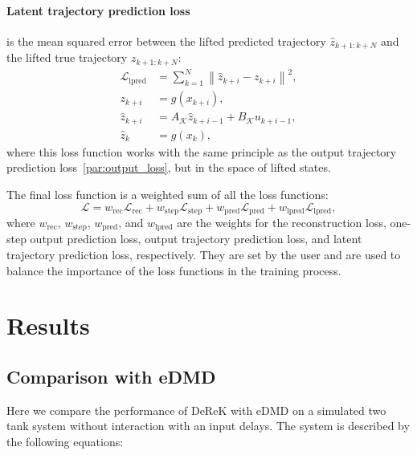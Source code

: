 \documentclass[conference]{IEEEtran}
\newcommand{\ui}[2]{#1_{\text{#2}}}
\begin{document}
\paragraph*{Latent trajectory prediction loss}
is the mean squared error between the lifted predicted trajectory \(\hat{z}_{k+1:k+N}\) and the lifted true trajectory \(z_{k+1:k+N}\):
\begin{subequations}
    \begin{align}
        \mathcal{L}_{\text{lpred}} & = \sum_{k=1}^{N}\left\|\hat{z}_{k+i} - z_{k+i}\right\|^2,  \\
        z_{k+i}                    & = g(x_{k+i}),                                              \\
        \hat{z}_{k+i}              & = A_{\mathcal{K}}\hat{z}_{k+i-1}+B_{\mathcal{K}}u_{k+i-1}, \\
        \hat{z}_{k}                & = g(x_{k}),
    \end{align}
\end{subequations}
where this loss function works with the same principle as the output trajectory prediction loss~\ref{par:output_loss}, but in the space of lifted states.

The final loss function is a weighted sum of all the loss functions:
\begin{equation}
    \mathcal{L} = \ui{w}{rec}\mathcal{L}_{\text{rec}} + \ui{w}{step}\mathcal{L}_{\text{step}} + \ui{w}{pred}\mathcal{L}_{\text{pred}} + \ui{w}{lpred}\mathcal{L}_{\text{lpred}},
\end{equation}
where \(\ui{w}{rec}\), \(\ui{w}{step}\), \(\ui{w}{pred}\), and \(\ui{w}{lpred}\) are the weights for the reconstruction loss, one-step output prediction loss, output trajectory prediction loss, and latent trajectory prediction loss, respectively. They are set by the user and are used to balance the importance of the loss functions in the training process.


\section{Results}

\subsection{Comparison with eDMD}

Here we compare the performance of DeReK with eDMD on a simulated two tank system without interaction with an input delays. The system is described by the following equations:
\end{document}

